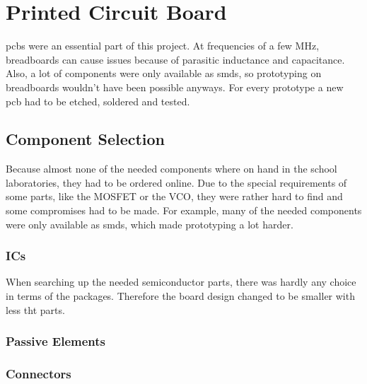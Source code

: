 \chapter{Printed Circuit Board}

\glspl{pcb} were an essential part of this project. At frequencies of a few MHz, breadboards can cause issues because of parasitic inductance and capacitance. Also, a lot of components were only available as \glspl{smd}, so prototyping on breadboards wouldn't have been possible anyways. For every prototype a new \gls{pcb} had to be etched, soldered and tested.

\section{Component Selection}

Because almost none of the needed components where on hand in the school laboratories, they had to be ordered online. Due to the special requirements of some parts, like the MOSFET or the VCO, they were rather hard to find and some compromises had to be made.
For example, many of the needed components were only available as \glspl{smd}, which made prototyping a lot harder. 

\subsection{ICs}

When searching up the needed semiconductor parts, there was hardly any choice in terms of the packages. Therefore the board design changed to be smaller with less \gls{tht} parts.

\subsection{Passive Elements}



\subsection{Connectors}




